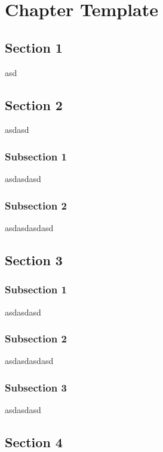 \chapter{Chapter Template}
\label{chapter-template} %

\section{Section 1}
asd

\section{Section 2}
asdasd

\subsection{Subsection 1}
asdasdasd

\subsection{Subsection 2}
asdasdasdasd

\section{Section 3}

\subsection{Subsection 1}
asdasdasd

\subsection{Subsection 2}
asdasdasdasd

\subsection{Subsection 3}
asdasdasd

\section{Section 4}

